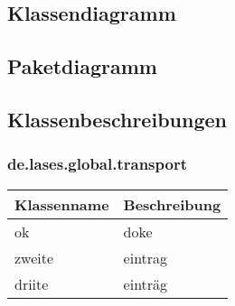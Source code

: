 
\newcommand{\classtable}[1]{\begin{longtable}[H]{|m{5cm}|m{9cm}|}
		\hline
		\textbf{Klassenname} & \textbf{Beschreibung} \\
		\hline
		\hline
		#1
	\end{longtable}
}

\newcommand{\classentry}[2]{#1 & #2 \\
	\hline}


\subsection{Klassendiagramm}

\subsection{Paketdiagramm}

\subsection{Klassenbeschreibungen}

\subsubsection{de.lases.global.transport}

\classtable{
	\classentry{ok}{doke}
	\classentry{zweite}{eintrag}
	\classentry{driite}{einträg}

}